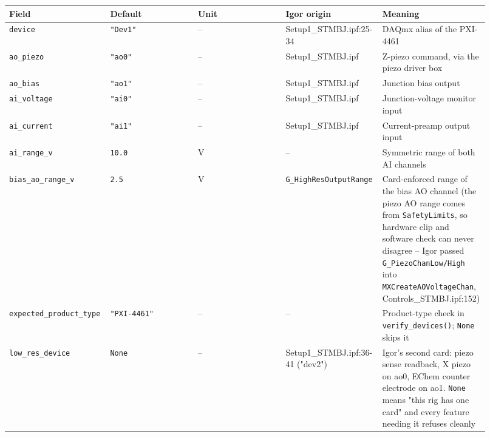 \footnotesize\setlength{\LTleft}{0pt}\setlength{\LTright}{\fill}
\begin{longtable}{@{}>{\raggedright\arraybackslash}p{0.184\linewidth}>{\raggedright\arraybackslash}p{0.184\linewidth}>{\raggedright\arraybackslash}p{0.184\linewidth}>{\raggedright\arraybackslash}p{0.184\linewidth}>{\raggedright\arraybackslash}p{0.184\linewidth}@{}}
\toprule
\textbf{Field} & \textbf{Default} & \textbf{Unit} & \textbf{Igor origin} & \textbf{Meaning} \\
\midrule\endhead
\texttt{device} & \texttt{"Dev1"} & -- & Setup1\_STMBJ.ipf:25-34 & DAQmx alias of the PXI-4461 \\
\texttt{ao\_\discretionary{}{}{}piezo} & \texttt{"ao0"} & -- & Setup1\_STMBJ.ipf & Z-piezo command, via the piezo driver box \\
\texttt{ao\_\discretionary{}{}{}bias} & \texttt{"ao1"} & -- & Setup1\_STMBJ.ipf & Junction bias output \\
\texttt{ai\_\discretionary{}{}{}voltage} & \texttt{"ai0"} & -- & Setup1\_STMBJ.ipf & Junction-voltage monitor input \\
\texttt{ai\_\discretionary{}{}{}current} & \texttt{"ai1"} & -- & Setup1\_STMBJ.ipf & Current-preamp output input \\
\texttt{ai\_\discretionary{}{}{}range\_\discretionary{}{}{}v} & \texttt{10.\discretionary{}{}{}0} & V & -- & Symmetric range of both AI channels \\
\texttt{bias\_\discretionary{}{}{}ao\_\discretionary{}{}{}range\_\discretionary{}{}{}v} & \texttt{2.\discretionary{}{}{}5} & V & \texttt{G\_\discretionary{}{}{}High\discretionary{}{}{}Res\discretionary{}{}{}Output\discretionary{}{}{}Range} & Card-enforced range of the bias AO channel (the piezo AO range comes from \texttt{Safety\discretionary{}{}{}Limits}, so hardware clip and software check can never disagree -- Igor passed \texttt{G\_\discretionary{}{}{}Piezo\discretionary{}{}{}Chan\discretionary{}{}{}Low/\discretionary{}{}{}High} into \texttt{MXCreate\discretionary{}{}{}AOVoltage\discretionary{}{}{}Chan}, Controls\_STMBJ.ipf:152) \\
\texttt{expected\_\discretionary{}{}{}product\_\discretionary{}{}{}type} & \texttt{"PXI-4461"} & -- & -- & Product-type check in \texttt{verify\_\discretionary{}{}{}devices()}; \texttt{None} skips it \\
\texttt{low\_\discretionary{}{}{}res\_\discretionary{}{}{}device} & \texttt{None} & -- & Setup1\_STMBJ.ipf:36-41 ("dev2") & Igor's second card: piezo sense readback, X piezo on ao0, EChem counter electrode on ao1. \texttt{None} means "this rig has one card" and every feature needing it refuses cleanly \\
\bottomrule
\end{longtable}
\normalsize

